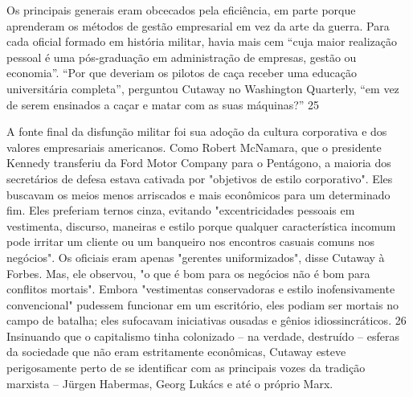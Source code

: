  
\par
 
Os principais generais eram obcecados pela eficiência, em parte porque aprenderam os métodos de gestão empresarial em vez da arte da guerra. Para cada oficial formado em história militar, havia mais cem “cuja maior realização pessoal é uma pós-graduação em administração de empresas, gestão ou economia”. “Por que deveriam os pilotos de caça receber uma educação universitária completa”, perguntou Cutaway no Washington Quarterly, “em vez de serem ensinados a caçar e matar com as suas máquinas?”
 {\color{blue} 25}  

 
\par
 
A fonte final da disfunção militar foi sua adoção da cultura corporativa e dos valores empresariais americanos. Como Robert McNamara, que o presidente Kennedy transferiu da Ford Motor Company para o Pentágono, a maioria dos secretários de defesa estava cativada por "objetivos de estilo corporativo". Eles buscavam os meios menos arriscados e mais econômicos para um determinado fim. Eles preferiam ternos cinza, evitando "excentricidades pessoais em vestimenta, discurso, maneiras e estilo porque qualquer característica incomum pode irritar um cliente ou um banqueiro nos encontros casuais comuns nos negócios". Os oficiais eram apenas "gerentes uniformizados", disse Cutaway à Forbes. Mas, ele observou, "o que é bom para os negócios não é bom para conflitos mortais". Embora "vestimentas conservadoras e estilo inofensivamente convencional" pudessem funcionar em um escritório, eles podiam ser mortais no campo de batalha; eles sufocavam iniciativas ousadas e gênios idiossincráticos.
 {\color{blue} 26}  
Insinuando que o capitalismo tinha colonizado – na verdade, destruído – esferas da sociedade que não eram estritamente econômicas, Cutaway esteve perigosamente perto de se identificar com as principais vozes da tradição marxista – Jürgen Habermas, Georg Lukács e até o próprio Marx.
 
\par
 

